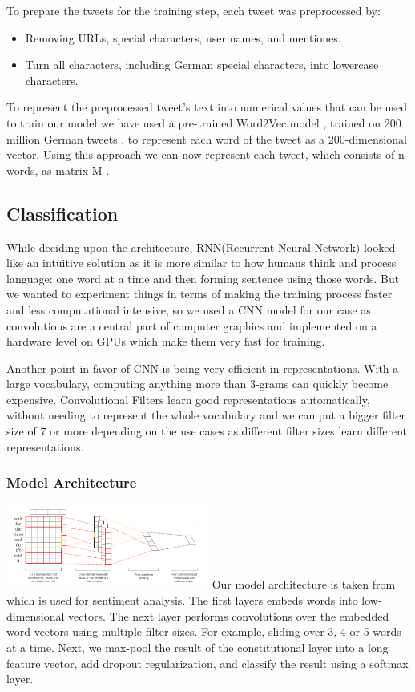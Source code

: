 \documentclass[10pt, oneside]{article}
\begin{document}
\begin{multicols}{2}
To prepare the tweets for the training step, each tweet was preprocessed by:
\begin{itemize}
\item Removing URLs, special characters, user names, and mentiones.
\item Turn all characters, including German special characters, into lowercase characters.
\end{itemize}

To represent the preprocessed tweet’s text into numerical values that can be used to train our model we have used  a pre-trained Word2Vec model \cite{DBLP:journals/corr/abs-1301-3781}, trained on 200 million German tweets \cite{cieliebak2017twitter},  to represent each word of the tweet as a  200-dimensional vector.  Using this approach we can now represent each tweet, which consists of n words, as matrix {M}  .
\subsection{Classification}

While deciding upon the architecture, RNN(Recurrent Neural Network) looked like an intuitive solution as it is more similar to how humans think and process language: one word at a time and then forming sentence using those words. But we wanted to experiment things in terms of making the training process faster and less computational intensive, so we used a CNN model for our case as convolutions are a central part of computer graphics and implemented on a hardware level on GPUs which make them very fast for training.

Another point in favor of CNN is being very efficient in representations.  With a large vocabulary, computing anything more than 3-grams can quickly become expensive.  Convolutional Filters learn good representations automatically, without needing to represent the whole vocabulary and we can put a bigger filter size of 7 or more depending on the use cases as different filter sizes learn different representations. 

\subsubsection{Model Architecture}
\includegraphics[width=0.5\textwidth]{images/cnn_architecture1.png}
Our model architecture is taken from \cite{Kim2014} which is used for sentiment analysis. The first layers embeds words into low-dimensional vectors. The next layer performs convolutions over the embedded word vectors using multiple filter sizes. For example, sliding over 3, 4 or 5 words at a time. Next, we max-pool the result of the constitutional layer into a long feature vector, add dropout regularization, and classify the result using a softmax layer.




\end{multicols}
\end{document}
